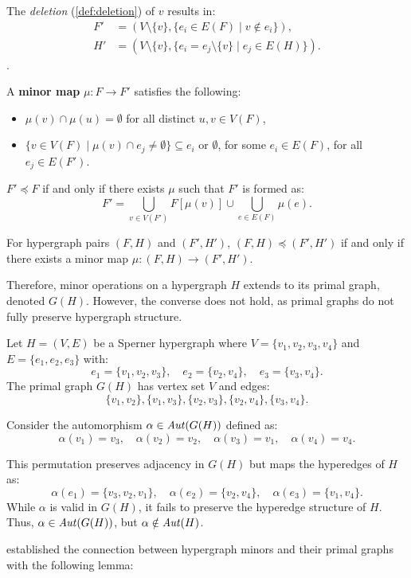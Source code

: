 The \emph{deletion} (\ref{def:deletion}) of $v$ results in:
\begin{align*}
F'&=\left(V\setminus\{v\},\{e_i\in E(F)\mid v\notin e_i\}\right),\\
H'&=\left(V\setminus\{v\},\{e_i=e_j\setminus\{v\}\mid e_j\in E(H)\}\right).
\end{align*}
\cite{BS15}.

A \textbf{minor map} $\mu:F\to F'$ satisfies the following:
\begin{itemize}
\item $\mu(v)\cap\mu(u)=\emptyset$ for all distinct $u,v\in V(F)$,
\item $\{v\in V(F)\mid\mu(v)\cap e_j\neq\emptyset\}\subseteq e_i$ or $\emptyset$, for some $e_i\in E(F)$, for all $e_j\in E(F')$.
\end{itemize}

$F'\preceq F$ if and only if there exists $\mu$ such that $F'$ is formed as:
\[
F'=\bigcup_{v\in V(F')}F[\mu(v)]\cup\bigcup_{e\in E(F)}\mu(e).
\]

For hypergraph pairs $(F,H)$ and $(F',H')$, $(F,H)\preceq(F',H')$ if and only if there exists a minor map $\mu:(F,H)\to(F',H')$.

Therefore, minor operations on a hypergraph $H$ extends to its primal graph, denoted $G(H)$. However, the converse does not hold, as primal graphs do not fully preserve hypergraph structure.

\begin{example}
Let $H=(V,E)$ be a Sperner hypergraph where $V=\{v_1,v_2,v_3,v_4\}$ and $E=\{e_1,e_2,e_3\}$ with:
\[
e_1=\{v_1,v_2,v_3\},\quad e_2=\{v_2,v_4\},\quad e_3=\{v_3,v_4\}.
\]
The primal graph $G(H)$ has vertex set $V$ and edges:
\[
\{v_1,v_2\},\{v_1,v_3\},\{v_2,v_3\},\{v_2,v_4\},\{v_3,v_4\}.
\]

Consider the automorphism $\alpha\in\mathit{Aut}(G(H))$ defined as:
\[
\alpha(v_1)=v_3,\quad\alpha(v_2)=v_2,\quad\alpha(v_3)=v_1,\quad\alpha(v_4)=v_4.
\]

This permutation preserves adjacency in $G(H)$ but maps the hyperedges of $H$ as:
\[
\alpha(e_1)=\{v_3,v_2,v_1\},\quad\alpha(e_2)=\{v_2,v_4\},\quad\alpha(e_3)=\{v_1,v_4\}.
\]
While $\alpha$ is valid in $G(H)$, it fails to preserve the hyperedge structure of $H$. Thus, $\alpha\in\mathit{Aut}(G(H))$, but $\alpha\notin\mathit{Aut}(H)$.
\end{example}

\cite{AGT12} established the connection between hypergraph minors and their primal graphs with the following lemma:


